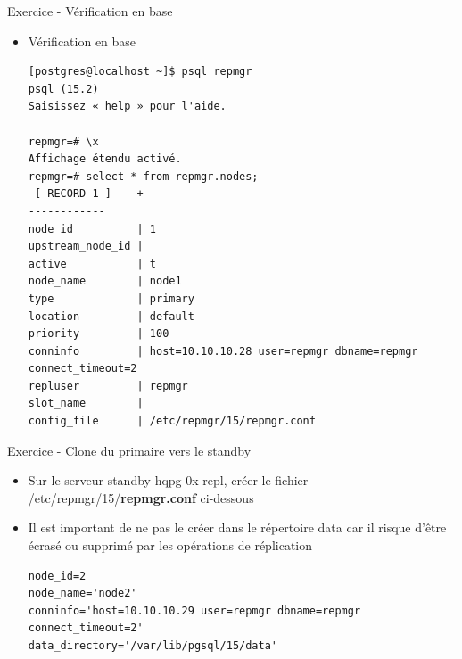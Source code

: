 \begin{frame}[fragile]{Exercice - Vérification en base}

   \begin{itemize}
      \item Vérification en base
\begin{tiny}
\begin{Verbatim}[commandchars=\&\{\}]
[postgres@localhost ~]$ psql repmgr
psql (15.2)
Saisissez « help » pour l'aide.

repmgr=# \x
Affichage étendu activé.
repmgr=# select * from repmgr.nodes;
-[ RECORD 1 ]----+-------------------------------------------------------------
node_id          | 1
upstream_node_id | 
active           | t
node_name        | node1
type             | primary
location         | default
priority         | 100
conninfo         | host=10.10.10.28 user=repmgr dbname=repmgr connect_timeout=2
repluser         | repmgr
slot_name        | 
config_file      | /etc/repmgr/15/repmgr.conf
\end{Verbatim}
\end{tiny}
   \end{itemize}

\begin{toile}
\end{toile}

\end{frame}


\begin{frame}[fragile]{Exercice - Clone du primaire vers le standby}

   \begin{itemize}
      \item Sur le serveur standby hqpg-0x-repl, créer le fichier /etc/repmgr/15/\textbf{repmgr.conf} ci-dessous
      \item Il est important de ne pas le créer dans le répertoire data car il risque d'être écrasé ou supprimé par les opérations de réplication
\begin{tiny}
\begin{Verbatim}[commandchars=\\\{\}]
node_id=2
node_name='node2'
conninfo='host=10.10.10.29 user=repmgr dbname=repmgr connect_timeout=2'
data_directory='/var/lib/pgsql/15/data'
\end{Verbatim}
\end{tiny}
   \end{itemize}

\begin{toile}
\end{toile}

\end{frame}

